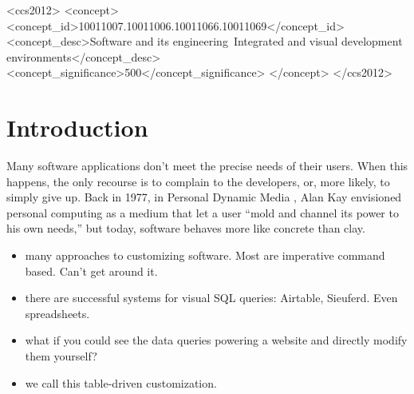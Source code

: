 \documentclass[sigplan,10pt,anonymous,review]{acmart}
\providecommand{\tightlist}{%
  \setlength{\itemsep}{0pt}\setlength{\parskip}{0pt}}
\begin{document}
\begin{CCSXML}
<ccs2012>
<concept>
<concept_id>10011007.10011006.10011066.10011069</concept_id>
<concept_desc>Software and its engineering~Integrated and visual development environments</concept_desc>
<concept_significance>500</concept_significance>
</concept>
</ccs2012>
\end{CCSXML}




\maketitle

\hypertarget{introduction}{%
\section{Introduction}\label{introduction}}

Many software applications don't meet the precise needs of their users.
When this happens, the only recourse is to complain to the developers,
or, more likely, to simply give up. Back in 1977, in Personal Dynamic
Media \citep{kay1977}, Alan Kay envisioned personal computing as a
medium that let a user ``mold and channel its power to his own needs,''
but today, software behaves more like concrete than clay.

\begin{itemize}
\tightlist
\item
  many approaches to customizing software. Most are imperative command
  based. Can't get around it.
\item
  there are successful systems for visual SQL queries: Airtable,
  Sieuferd. Even spreadsheets.
\item
  what if you could see the data queries powering a website and directly
  modify them yourself?
\item
  we call this table-driven customization.
\end{itemize}
\end{document}
